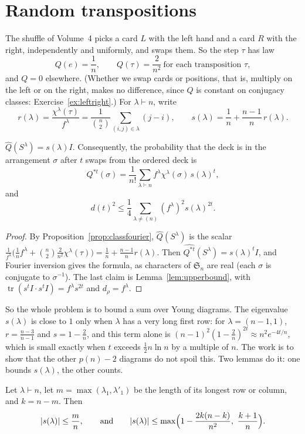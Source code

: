 \section{Random transpositions}

The shuffle of Volume~4 picks a card $L$ with the left hand and a card $R$ with the right, independently and uniformly, and swaps them. So the step $\tau$ has law
\[
Q(e)=\frac1n,\qquad Q(\tau)=\frac2{n^2}\ \text{for each transposition }\tau,
\]
and $Q=0$ elsewhere. (Whether we swap cards or positions, that is, multiply on the left or on the right, makes no difference, since $Q$ is constant on conjugacy classes: Exercise~\ref{ex:leftright}.) For $\lambda\vdash n$, write
\[
r(\lambda)=\frac{\chi^\lambda(\tau)}{f^\lambda}=\frac1{\binom n2}\sum_{(i,j)\in\lambda}(j-i),\qquad s(\lambda)=\frac1n+\frac{n-1}n\,r(\lambda).
\]

\begin{proposition}\label{prop:eigenvalues}
$\hat Q(S^\lambda)=s(\lambda)I$. Consequently, the probability that the deck is in the arrangement $\sigma$ after $t$ swaps from the ordered deck is
\[
Q^{*t}(\sigma)=\frac1{n!}\sum_{\lambda\vdash n}f^\lambda\chi^\lambda(\sigma)\,s(\lambda)^t,
\]
and
\[
d(t)^2\le\frac14\sum_{\lambda\ne(n)}(f^\lambda)^2s(\lambda)^{2t}.
\]
\end{proposition}

\begin{proof}
By Proposition~\ref{prop:classfourier}, $\hat Q(S^\lambda)$ is the scalar $\frac1{f^\lambda}\bigl(\frac1nf^\lambda+\binom n2\frac2{n^2}\chi^\lambda(\tau)\bigr)=\frac1n+\frac{n-1}nr(\lambda)$. Then $\widehat{Q^{*t}}(S^\lambda)=s(\lambda)^tI$, and Fourier inversion gives the formula, as characters of
$\mathfrak S_n$ are real (each $\sigma$ is conjugate to $\sigma^{-1}$). The last claim is Lemma~\ref{lem:upperbound}, with $\operatorname{tr}(s^tI\cdot s^tI)=f^\lambda s^{2t}$ and $d_\rho=f^\lambda$.
\end{proof}

So the whole problem is to bound a sum over Young diagrams. The eigenvalue $s(\lambda)$ is close to $1$ only when $\lambda$ has a very long first row: for $\lambda=(n-1,1)$, $r=\frac{n-3}{n-1}$ and $s=1-\frac2n$, and this term alone is $(n-1)^2(1-\frac2n)^{2t}\approx n^2e^{-4t/n}$,
which is small exactly when $t$ exceeds $\frac12n\ln n$ by a multiple of $n$. The work is to show that the other $p(n)-2$ diagrams do not spoil this. Two lemmas do it: one bounds $s(\lambda)$, the other counts.

\begin{lemma}\label{lem:ratiobounds}
Let $\lambda\vdash n$, let $m=\max(\lambda_1,\lambda'_1)$ be the length of its longest row or column, and $k=n-m$. Then
\[
|s(\lambda)|\le\frac mn,\qquad\text{and}\qquad|s(\lambda)|\le\max\Bigl(1-\frac{2k(n-k)}{n^2},\ \frac{k+1}n\Bigr).
\]
\end{lemma}


